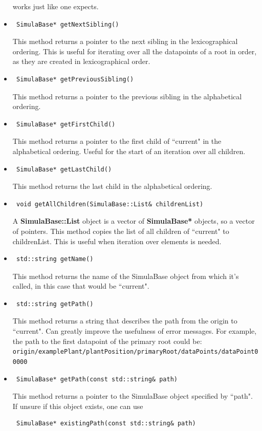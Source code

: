 \documentclass{article}
\begin{document}
\begin{itemize}
works just like one expects.
\item \begin{verbatim} SimulaBase* getNextSibling() \end{verbatim}
This method returns a pointer to the next sibling in the lexicographical ordering. This is useful for iterating over all the datapoints of a root in order, as they are created in lexicographical order.
\item \begin{verbatim} SimulaBase* getPreviousSibling() \end{verbatim}
This method returns a pointer to the previous sibling in the alphabetical ordering.
\item \begin{verbatim} SimulaBase* getFirstChild() \end{verbatim}
This method returns a pointer to the first child of ``current" in the alphabetical ordering. Useful for the start of an iteration over all children.
\item \begin{verbatim} SimulaBase* getLastChild() \end{verbatim}
This method returns the last child in the alphabetical ordering.
\item \begin{verbatim} void getAllChildren(SimulaBase::List& childrenList) \end{verbatim}
A \textbf{SimulaBase::List} object is a vector of \textbf{SimulaBase*} objects, so a vector of pointers. This method copies the list of all children of ``current" to childrenList. This is useful when iteration over elements is needed.
\item \begin{verbatim} std::string getName() \end{verbatim}
This method returns the name of the SimulaBase object from which it's called, in this case that would be ``current".
\item \begin{verbatim} std::string getPath() \end{verbatim}
This method returns a string that describes the path from the origin to ``current". Can greatly improve the usefulness of error messages. For example, the path to the first datapoint of the primary root could be: \verb| origin/examplePlant/plantPosition/primaryRoot/dataPoints/dataPoint00000 |
\item \begin{verbatim} SimulaBase* getPath(const std::string& path) \end{verbatim}
This method returns a pointer to the SimulaBase object specified by ``path". If unsure if this object exists, one can use
\begin{verbatim} SimulaBase* existingPath(const std::string& path) \end{verbatim}
\end{itemize}
\end{document}
